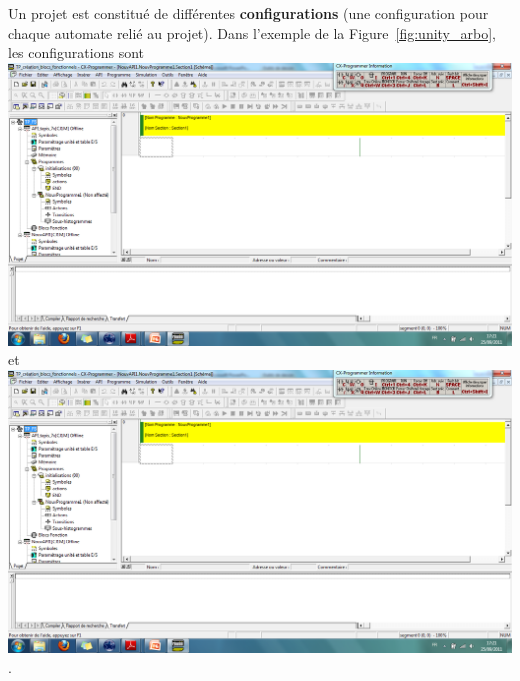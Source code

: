Un projet est constitué de différentes \textbf{configurations} (une configuration pour chaque automate relié au projet). Dans l'exemple de la Figure~\ref{fig:unity_arbo}, les configurations sont \includegraphics[trim = 40 582 1200 170, clip,height=\fontcharht\font`\B]{images/unity_arbo} et \includegraphics[trim = 40 296 1210 457, clip,height=\fontcharht\font`\B]{images/unity_arbo}.

